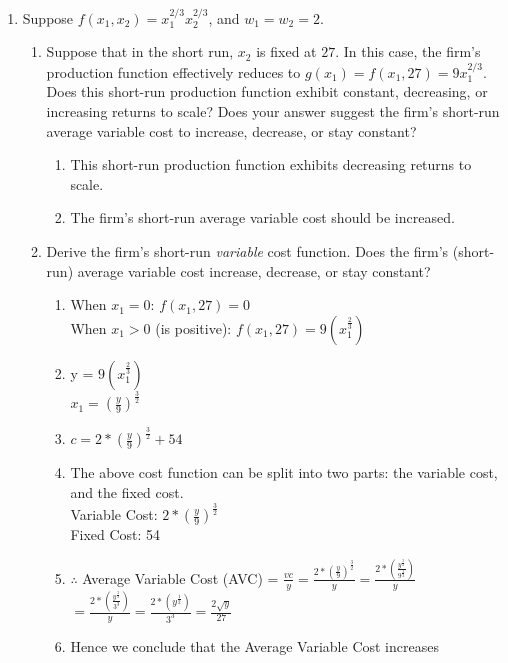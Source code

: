 \documentclass[11pt]{article}
\begin{document}
\begin{enumerate}
\item Suppose $f(x_{1},x_{2})=x_{1}^{2/3}x_{2}^{2/3}$, and $w_{1}=w_{2}=2$.
    \begin{enumerate}
        \item Suppose that in the short run, $x_{2}$ is fixed at $27$. In this case, the firm's production function effectively reduces to $g(x_{1})=f(x_{1},27)=9x_{1}^{2/3}$. Does this short-run production function exhibit constant, decreasing, or increasing returns to scale? Does your answer suggest the firm's short-run average variable cost to increase, decrease, or stay constant?
        \begin{enumerate}
            \item This short-run production function exhibits decreasing returns to scale.
            \item The firm's short-run average variable cost should be increased.
        \end{enumerate}

        \item Derive the firm's short-run \emph{variable} cost function. Does the firm's (short-run) average variable cost increase, decrease, or stay constant?
        \begin{enumerate}
            \item When $x_1 = 0$: $f(x_1,27) = 0$\\
            When $x_1 > 0$ (is positive): $f(x_1,27) = 9(x_1^{\frac{2}{3}})$
            \item y = $9(x_1^{\frac{2}{3}})$\\
            $x_1 = (\frac{y}{9})^{\frac{3}{2}}$
            \item $c = 2*(\frac{y}{9})^{\frac{3}{2}}+54$
            \item The above cost function can be split into two parts: the variable cost, and the fixed cost. \\
            Variable Cost: $2*(\frac{y}{9})^{\frac{3}{2}}$\\
            Fixed Cost: 54
            \item $\therefore$ Average Variable Cost (AVC) = $\frac{vc}{y}=\frac{2*(\frac{y}{9})^{\frac{3}{2}}}{y} = \frac{2*(\frac{y^{\frac{3}{2}}}{9^{\frac{3}{2}}})}{y}$\\
            $= \frac{2*(\frac{y^{\frac{3}{2}}}{3^{3}})}{y} = \frac{2*(y^{\frac{1}{2}})}{3^{3}} = \frac{2\sqrt{y}}{27}$
            \item Hence we conclude that the Average Variable Cost increases
        \end{enumerate}


\end{enumerate}
\end{enumerate}
\end{document}
